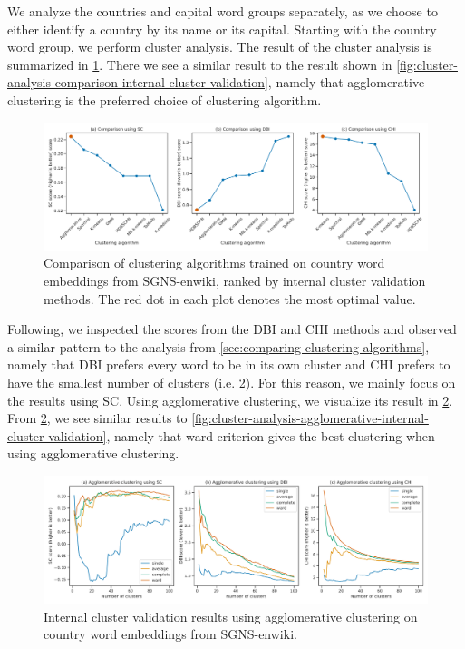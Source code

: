We analyze the countries and capital word groups separately, as we choose to either identify a country by its name or its capital. Starting with the country word group, we perform cluster analysis. The result of the cluster analysis is summarized in \cref{fig:cluster-analysis-country-word-group-internal-cluster-validation}. There we see a similar result to the result shown in \cref{fig:cluster-analysis-comparison-internal-cluster-validation}, namely that agglomerative clustering is the preferred choice of clustering algorithm.
\begin{figure}[H]
    \centering
    \includegraphics[width=\textwidth]{thesis/figures/cluster-analysis-country-word-group-internal-cluster-validation.pdf}
    \caption{Comparison of clustering algorithms trained on country word embeddings from SGNS-enwiki, ranked by internal cluster validation methods. The red dot in each plot denotes the most optimal value.}
    \label{fig:cluster-analysis-country-word-group-internal-cluster-validation}
\end{figure}

Following, we inspected the scores from the DBI and CHI methods and observed a similar pattern to the analysis from \cref{sec:comparing-clustering-algorithms}, namely that DBI prefers every word to be in its own cluster and CHI prefers to have the smallest number of clusters (i.e. 2). For this reason, we mainly focus on the results using SC. Using agglomerative clustering, we visualize its result in \cref{fig:cluster-analysis-agglomerative-country-word-group-internal-cluster-validation}. From \cref{fig:cluster-analysis-agglomerative-country-word-group-internal-cluster-validation}, we see similar results to \cref{fig:cluster-analysis-agglomerative-internal-cluster-validation}, namely that ward criterion gives the best clustering when using agglomerative clustering.
\begin{figure}[H]
    \centering
    \includegraphics[width=\textwidth]{thesis/figures/cluster-analysis-agglomerative-country-word-group-internal-cluster-validation.pdf}
    \caption{Internal cluster validation results using agglomerative clustering on country word embeddings from SGNS-enwiki.}
    \label{fig:cluster-analysis-agglomerative-country-word-group-internal-cluster-validation}
\end{figure}

